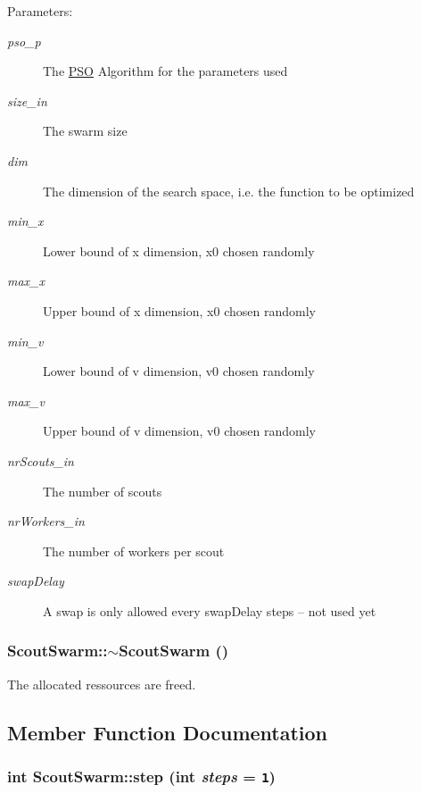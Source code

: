 \begin{Desc}
\item[Parameters: ]\par
\begin{description}
\item[{\em 
pso\_\-p}]The \hyperlink{classPSO}{PSO} Algorithm for the parameters used \item[{\em 
size\_\-in}]The swarm size \item[{\em 
dim}]The dimension of the search space, i.e. the function to be optimized \item[{\em 
min\_\-x}]Lower bound of x dimension, x0 chosen randomly \item[{\em 
max\_\-x}]Upper bound of x dimension, x0 chosen randomly \item[{\em 
min\_\-v}]Lower bound of v dimension, v0 chosen randomly \item[{\em 
max\_\-v}]Upper bound of v dimension, v0 chosen randomly \item[{\em 
nrScouts\_\-in}]The number of scouts \item[{\em 
nrWorkers\_\-in}]The number of workers per scout \item[{\em 
swapDelay}]A swap is only allowed every swapDelay steps -- not used yet \end{description}
\end{Desc}
\hypertarget{classScoutSwarm_00b7c0dcdeeeec07fe2d70eb66fe0a65}{
\subsubsection{\setlength{\rightskip}{0pt plus 5cm}ScoutSwarm::$\sim$ScoutSwarm ()}}
\label{classScoutSwarm_00b7c0dcdeeeec07fe2d70eb66fe0a65}


The allocated ressources are freed. 



\subsection{Member Function Documentation}
\hypertarget{classScoutSwarm_4b8c1a2e57b949b3259c118fbadcb781}{
\subsubsection{\setlength{\rightskip}{0pt plus 5cm}int ScoutSwarm::step (int {\em steps} = {\tt 1})}}
\label{classScoutSwarm_4b8c1a2e57b949b3259c118fbadcb781}


